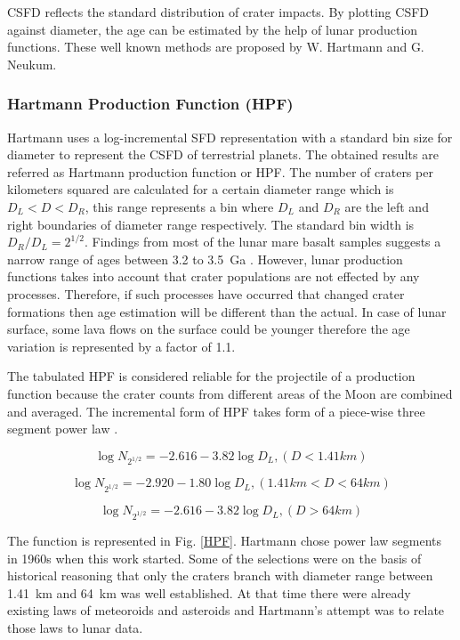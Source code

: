 \documentclass[11pt]{article}
\begin{document}
CSFD reflects the standard distribution of crater impacts. By plotting CSFD against diameter, the age can be estimated by the help of lunar production functions. These well known methods are proposed by W. Hartmann and G. Neukum.

\subsubsection{Hartmann Production Function (HPF)}
Hartmann uses a log-incremental SFD representation with a standard bin size for diameter to represent the CSFD of terrestrial planets. The obtained results are referred as Hartmann production function or HPF. The number of craters per kilometers squared are calculated for a certain diameter range which is $D_{L} < D < D_{R}$, this range represents a bin where $D_{L}$ and $D_{R}$ are the left and right boundaries of diameter range respectively. The standard bin width is $D_{R}/D_{L} = 2^{1/2}$. Findings from most of the lunar mare basalt samples suggests a narrow range of ages between 3.2 to \SI{3.5}{Ga} \cite{stoffler2001stratigraphy}. However, lunar production functions takes into account that crater populations are not effected by any processes. Therefore, if such processes have occurred that changed crater formations then age estimation will be different than the actual. In case of lunar surface, some lava flows on the surface could be younger \cite{hiesinger2000ages} therefore the age variation is represented by a factor of 1.1.

The tabulated HPF is considered reliable for the projectile of a production function because the crater counts from different areas of the Moon are combined and averaged. The incremental form of HPF takes form of a piece-wise three segment power law \cite{ivanov2002comparison}.

\begin{equation}
\log N_{2^{1/2}} = -2.616 - 3.82 \log D_{L}, (D<1.41km)
\end{equation}

\begin{equation}
\log N_{2^{1/2}} = -2.920 - 1.80 \log D_{L},
(1.41km < D < 64km)
\end{equation}

\begin{equation}
\log N_{2^{1/2}} = -2.616 - 3.82 \log D_{L},
(D>64km)
\end{equation}

The function is represented in Fig. \ref{HPF}. Hartmann chose power law segments in 1960s when this work started. Some of the selections were on the basis of historical reasoning that only the craters branch with diameter range between \SI{1.41}{km} and \SI{64}{km} was well established. At that time there were already existing laws of meteoroids and asteroids and Hartmann's attempt was to relate those laws to lunar data.
\end{document}
